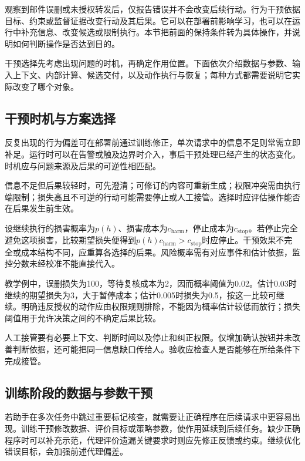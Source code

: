 观察到邮件误删或未授权转发后，仅报告错误并不会改变后续行动。行为干预依据目标、约束或监督证据改变行动及其后果。它可以在部署前影响学习，也可以在运行中补充信息、改变候选或限制执行。本节把前面的保持条件转为具体操作，并说明如何判断操作是否达到目的。

干预选择先考虑出现问题的时机，再确定作用位置。下面依次介绍数据与参数、输入上下文、内部计算、候选交付，以及动作执行与恢复；每种方式都需要说明它实际改变了哪个对象。

\subsection{干预时机与方案选择}
\label{sec:alignment-intervention-decision}

反复出现的行为偏差可在部署前通过训练修正，单次请求中的信息不足则常需立即补足。运行时可以在告警或触及边界时介入，事后干预处理已经产生的状态变化。时机应与问题来源及后果的可逆性相匹配。

信息不足但后果较轻时，可先澄清；可修订的内容可重新生成；权限冲突需由执行端限制；损失高且不可逆的行动可能需要停止或人工接管。选择时应评估操作能否在后果发生前生效。

设继续执行的损害概率为$p(h)$、损害成本为$c_{\mathrm{harm}}$，停止成本为$c_{\mathrm{stop}}$。若停止完全避免这项损害，比较期望损失便得到$p(h)c_{\mathrm{harm}}>c_{\mathrm{stop}}$时应停止。干预效果不完全或成本结构不同，应重算各选择的后果。风险概率需有对应事件和估计依据，监控分数未经校准不能直接代入。

教学例中，误删损失为100，等待复核成本为2，因而概率阈值为0.02。估计0.03时继续的期望损失为3，大于暂停成本；估计0.005时损失为0.5，按这一比较可继续。明确违反授权的动作应由权限规则排除，不能因为概率估计较低而放行；损失阈值用于允许决策之间的不确定后果比较。

人工接管要有必要上下文、判断时间以及停止和纠正权限。仅增加确认按钮并未改善判断依据，还可能把同一信息缺口传给人。验收应检查人是否能够在所给条件下完成接管。

\subsection{训练阶段的数据与参数干预}
\label{sec:alignment-learning}
\label{sec:alignment-learning-demonstration}
\label{sec:alignment-learning-policy}

若助手在多次任务中跳过重要标记核查，就需要让正确程序在后续请求中更容易出现。训练干预修改数据、评价目标或策略参数，使作用延续到后续任务。缺少正确程序时可以补充示范，代理评价遗漏关键要求时则应先修正反馈或约束。继续优化错误目标，会加强前述代理偏差。

